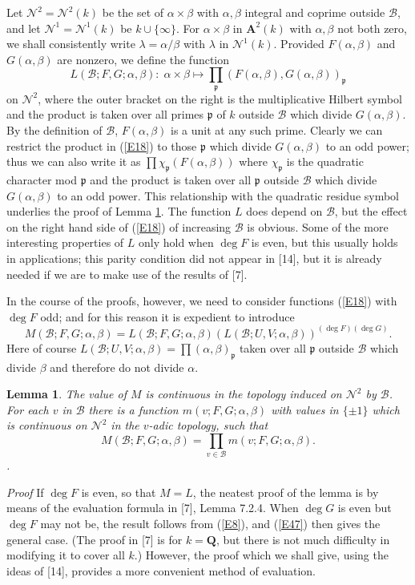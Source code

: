 \documentclass[12pt]{article}
\def\bA{{\mathbf A}}
\def\bQ{{\mathbf Q}}
\def\fp{{\mathfrak p}}
\def\ga{{\alpha}}
\def\gb{{\beta}}
\def\gl{{\lambda}}
\def\sB{{\mathcal B}}
\def\sN{{\mathcal N}}
\def\beq{\begin{equation} \label}
\def\ble{\begin{lemma} \label}
\def\ele{\end{lemma}}
\newtheorem{lemma}{Lemma}
\begin{document}
Let $\sN^2=\sN^2(k)$ be the set of $\ga\times\gb$ with
$\ga,\gb$ integral and coprime outside $\sB$, and let $\sN^1=\sN^1(k)$ be
$k\cup\{\infty\}$. For $\ga\times\gb$ in $\bA^2(k)$ with $\ga,\gb$ not both
zero, we shall consistently
write $\gl=\ga/\gb$ with $\gl$ in $\sN^1(k)$. Provided
$F(\ga,\gb)$ and $G(\ga,\gb)$ are nonzero, we define the function
\beq{E18} L(\sB;F,G;\ga,\gb):\;\ga\times\gb\mapsto
\prod_\fp(F(\ga,\gb),G(\ga,\gb))_\fp  \end{equation}
on $\sN^2$, where the outer bracket on the right is the multiplicative Hilbert
symbol and the product is taken over all primes $\fp$ of $k$ outside
$\sB$ which
divide $G(\ga,\gb)$. By the definition of $\sB$, $F(\ga,\gb)$
is a unit at any such prime. Clearly we can restrict the product in
(\ref{E18}) to those $\fp$ which divide $G(\ga,\gb)$ to an odd power; thus we
can also write it as $\prod\chi_\fp(F(\ga,\gb))$ where $\chi_\fp$ is the
quadratic character mod $\fp$ and the product is taken over all $\fp$ outside
$\sB$ which divide $G(\ga,\gb)$ to an odd power. This relationship with the
quadratic residue symbol underlies the proof of Lemma \ref{L5}.
The function $L$ does depend on $\sB$, but the effect on the 
right hand side of (\ref{E18}) of increasing $\sB$ is obvious.
Some of the more interesting properties of $L$ only hold when
$\deg F$ is even, but this usually holds in applications;
this parity condition did not appear in [14], but it is already
needed if we are to make use of the results of [7].

In the course of the proofs, however, we need to
consider functions (\ref{E18}) with $\deg F$ odd; and for this reason it is
expedient to introduce
\[ M(\sB;F,G;\ga,\gb)=L(\sB;F,G;\ga,\gb)(L(\sB;U,V;\ga,\gb))^{(\deg F)(\deg G)}. \]
Here of course $L(\sB;U,V;\ga,\gb)=\prod(\ga,\gb)_\fp$ taken over all $\fp$
outside $\sB$ which divide $\gb$ and therefore do not divide $\ga$.
\ble{L5} The value of $M$ is continuous in the
topology induced on $\sN^2$ by $\sB$. For each $v$ in $\sB$ there
is a function $m(v;F,G;\ga,\gb)$ with values in $\{\pm1\}$ which is
continuous on $\sN^2$ in the $v$-adic topology, such that
\beq{E22} M(\sB;F,G;\ga,\gb)=\prod_{v\in\sB}m(v;F,G;\ga,\gb). \end{equation}.
\ele
\emph{Proof} If $\deg F$ is even, so that $M=L$, the neatest
proof of the lemma is by means of the evaluation formula in
[7], Lemma 7.2.4. When $\deg G$ is even but $\deg F$ may not
be, the result follows from (\ref{E8}), and (\ref{E47}) then
gives the general case. (The proof in [7] is for $k=\bQ$, but
there is not much
difficulty in modifying it to cover all $k$.)
However, the proof which we shall give, using the
ideas of [14], provides a more convenient method of evaluation.
\end{document}
